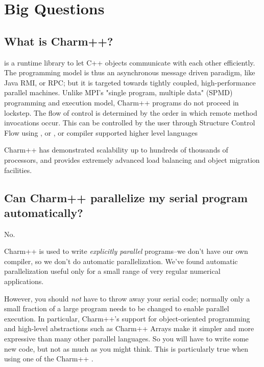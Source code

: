 \section{Big Questions}

\subsection{What is Charm++?}

is a runtime library to let C++ objects communicate with each other
efficiently.  The programming model is thus an asynchronous message
driven paradigm, like Java RMI, or RPC; but it is targeted towards
tightly coupled, high-performance parallel machines.  Unlike MPI's
"single program, multiple data" (SPMD) programming and execution model, Charm++ programs do not proceed in lockstep.  The flow of control is determined by the order in which remote method invocations occur.  This can be controlled by the user through Structure Control Flow using  , or , or compiler supported higher level languages 

Charm++ has demonstrated scalability up to hundreds of thousands of processors,
and provides extremely advanced load balancing and object migration facilities.

\subsection{Can Charm++ parallelize my serial program automatically?}

No.

Charm++ is used to write { \em explicitly parallel} programs--we don't have
our own compiler, so we don't do automatic parallelization. We've found
automatic parallelization useful only for a small range of very regular
numerical applications.

However, you should { \em not} have to throw away your serial code;
normally only a small fraction of a large program needs to be changed to
enable parallel execution. In particular, Charm++'s support for object-oriented
programming and high-level abstractions such as Charm++ Arrays make it
simpler and more expressive than many other parallel languages. So you
will have to write some new code, but not as much as you might think. This
is particularly true when using one of the Charm++ .


